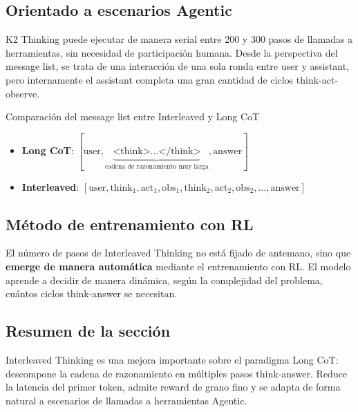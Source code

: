 \subsection{Orientado a escenarios Agentic}

K2 Thinking puede ejecutar de manera serial entre 200 y 300 pasos de llamadas a herramientas, sin necesidad de participación humana. Desde la perspectiva del message list, se trata de una interacción de una sola ronda entre user y assistant, pero internamente el assistant completa una gran cantidad de ciclos think-act-observe.

\begin{knowledgebox}{Comparación del message list entre Interleaved y Long CoT}
\begin{itemize}
  \item \textbf{Long CoT}: $[\text{user}, \underbrace{\text{<think>}\ldots\text{</think>}}_{\text{cadena de razonamiento muy larga}}, \text{answer}]$
  \item \textbf{Interleaved}: $[\text{user}, \text{think}_1, \text{act}_1, \text{obs}_1, \text{think}_2, \text{act}_2, \text{obs}_2, \ldots, \text{answer}]$
\end{itemize}
\end{knowledgebox}

\subsection{Método de entrenamiento con RL}

El número de pasos de Interleaved Thinking no está fijado de antemano, sino que \textbf{emerge de manera automática} mediante el entrenamiento con RL. El modelo aprende a decidir de manera dinámica, según la complejidad del problema, cuántos ciclos think-answer se necesitan.

\subsection{Resumen de la sección}

Interleaved Thinking es una mejora importante sobre el paradigma Long CoT: descompone la cadena de razonamiento en múltiples pasos think-answer. Reduce la latencia del primer token, admite reward de grano fino y se adapta de forma natural a escenarios de llamadas a herramientas Agentic.
